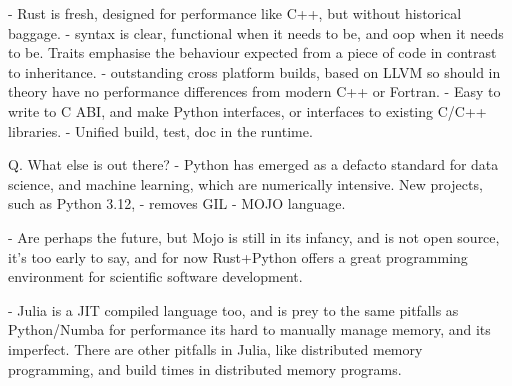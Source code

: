     - Rust is fresh, designed for performance like C++, but without historical baggage.
        - syntax is clear, functional when it needs to be, and oop when it needs to be. Traits emphasise the behaviour expected from a piece of code in contrast to inheritance.
        - outstanding cross platform builds, based on LLVM so should in theory have no performance differences from modern C++ or Fortran.
        - Easy to write to C ABI, and make Python interfaces, or interfaces to existing C/C++ libraries.
        - Unified build, test, doc in the runtime.


Q. What else is out there?
    - Python has emerged as a defacto standard for data science, and machine learning, which are numerically intensive. New projects, such as Python 3.12, - removes GIL
        - MOJO language.

    - Are perhaps the future, but Mojo is still in its infancy, and is not open source, it's too early to say, and for now Rust+Python offers a great programming environment for scientific software development.

    - Julia is a JIT compiled language too, and is prey to the same pitfalls as Python/Numba for performance its hard to manually manage memory, and its imperfect. There are other pitfalls in Julia, like distributed memory programming, and build times in distributed memory programs.


